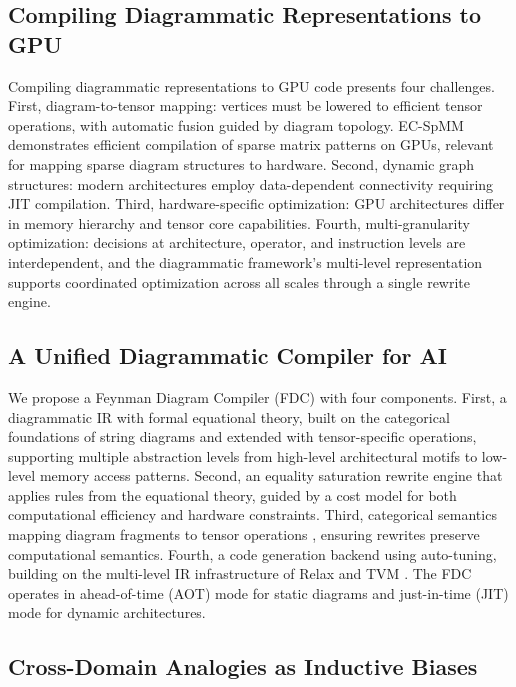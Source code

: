 \documentclass[12pt,a4paper]{article}
\begin{document}
\subsection{Compiling Diagrammatic Representations to GPU}

Compiling diagrammatic representations to GPU code presents four challenges. First, diagram-to-tensor mapping: vertices must be lowered to efficient tensor operations, with automatic fusion guided by diagram topology. EC-SpMM \cite{lin2023ecspmm} demonstrates efficient compilation of sparse matrix patterns on GPUs, relevant for mapping sparse diagram structures to hardware. Second, dynamic graph structures: modern architectures employ data-dependent connectivity requiring JIT compilation. Third, hardware-specific optimization: GPU architectures differ in memory hierarchy and tensor core capabilities. Fourth, multi-granularity optimization: decisions at architecture, operator, and instruction levels are interdependent, and the diagrammatic framework's multi-level representation supports coordinated optimization across all scales through a single rewrite engine.

\subsection{A Unified Diagrammatic Compiler for AI}

We propose a Feynman Diagram Compiler (FDC) with four components. First, a diagrammatic IR with formal equational theory, built on the categorical foundations of string diagrams \cite{toumi2022discopy} and extended with tensor-specific operations, supporting multiple abstraction levels from high-level architectural motifs to low-level memory access patterns. Second, an equality saturation rewrite engine that applies rules from the equational theory, guided by a cost model for both computational efficiency and hardware constraints. Third, categorical semantics mapping diagram fragments to tensor operations \cite{crescenzi2024towards}, ensuring rewrites preserve computational semantics. Fourth, a code generation backend using auto-tuning, building on the multi-level IR infrastructure of Relax \cite{lai2023relax} and TVM \cite{chen2018tvma}. The FDC operates in ahead-of-time (AOT) mode for static diagrams and just-in-time (JIT) mode for dynamic architectures.

\subsection{Cross-Domain Analogies as Inductive Biases}
\end{document}
